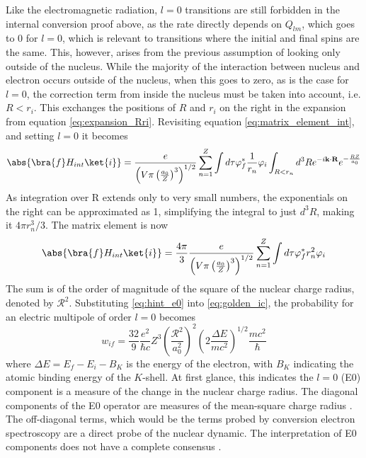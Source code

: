 Like the electromagnetic radiation, $l=0$ transitions are still forbidden in the internal conversion proof above, as the rate directly depends on $Q_{lm}$, which goes to 0 for $l=0$, which is relevant to transitions where the initial and final spins are the same. This, however, arises from the previous assumption of looking only outside of the nucleus. While the majority of the interaction between nucleus and electron occurs outside of the nucleus, when this goes to zero, as is the case for $l=0$, the correction term from inside the nucleus must be taken into account, i.e. $R<r_i$. This exchanges the positions of $R$ and $r_i$ on the right in the expansion from equation \ref{eq:expansion_Rri}. Revisiting equation \ref{eq:matrix_element_int}, and setting $l=0$ it becomes
\begin{equation}
\label{eq:matrix_element_E0}
    \abs{\bra{f}H_{int}\ket{i}} = \frac{e}{\left(V\pi\left(\frac{a_0}{Z}\right)^3\right)^{1/2}}\sum_{n=1}^Z \int d\tau\varphi_{f}^*\frac{1}{r_n}\varphi_{i} \int_{R<r_n}d^3R e^{-i\textbf{k}\cdot\textbf{R}} e^{-\frac{RZ}{a_0}}
\end{equation}
As integration over R extends only to very small numbers, the exponentials on the right can be approximated as 1, simplifying the integral to just $d^3R$, making it $4\pi r_n^3/3$. The matrix element is now
\begin{equation}
\label{eq:hint_e0}
    \abs{\bra{f}H_{int}\ket{i}} =  \frac{4\pi}{3}\frac{e}{\left(V\pi\left(\frac{a_0}{Z}\right)^3\right)^{1/2}} \sum_{n=1}^Z \int d\tau\varphi_{f}^*r_n^2\varphi_{i}
\end{equation}
The sum is of the order of magnitude of the square of the nuclear charge radius, denoted by $\mathcal{R}^2$. Substituting \ref{eq:hint_e0} into \ref{eq:golden_ic}, the probability for an electric multipole of order $l=0$ becomes
\begin{equation}
    w_{if} = \frac{32}{9}\frac{e^2}{\hbar c}Z^3\left(\frac{\mathcal{R}^2}{a_0^2}\right)^2\left(2\frac{\Delta E}{mc^2}\right)^{1/2}\frac{mc^2}{\hbar}
\end{equation}
where $\Delta E=E_f-E_i-B_K$ is the energy of the electron, with $B_K$ indicating the atomic binding energy of the $K$-shell. At first glance, this indicates the $l=0$ (E0) component is a measure of the change in the nuclear charge radius. The diagonal components of the E0 operator are measures of the mean-square charge radius \citep{wood99:_e0}. The off-diagonal terms, which would be the terms probed by conversion electron spectroscopy are a direct probe of the nuclear dynamic. The interpretation of E0 components does not have a complete consensus \citep{ilie11:_deformed}.

